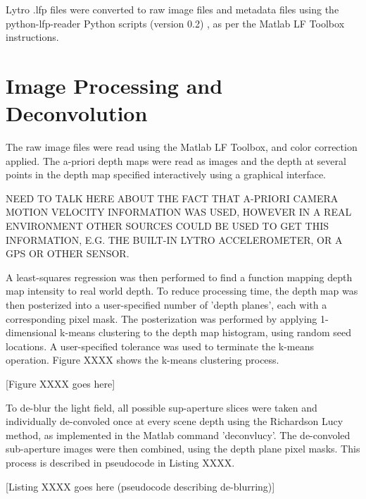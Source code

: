 Lytro .lfp files were converted to raw image files and metadata files using the python-lfp-reader Python scripts (version 0.2) \cite{esfahbod2013python}, as per the Matlab LF Toolbox instructions.


\section{Image Processing and Deconvolution}

The raw image files were read using the Matlab LF Toolbox, and color correction applied.
The a-priori depth maps were read as images and the depth at several points in the depth map specified interactively using a graphical interface.

NEED TO TALK HERE ABOUT THE FACT THAT A-PRIORI CAMERA MOTION VELOCITY INFORMATION WAS USED, HOWEVER IN A REAL ENVIRONMENT OTHER SOURCES COULD BE USED TO GET THIS INFORMATION, E.G. THE BUILT-IN LYTRO ACCELEROMETER, OR A GPS OR OTHER SENSOR.

A least-squares regression was then performed to find a function mapping depth map intensity to real world depth.
To reduce processing time, the depth map was then posterized into a user-specified number of 'depth planes', each with a corresponding pixel mask.
The posterization was performed by applying 1-dimensional k-means clustering to the depth map histogram, using random seed locations.
A user-specified tolerance was used to terminate the k-means operation.
Figure XXXX shows the k-means clustering process.

[Figure XXXX goes here]

To de-blur the light field, all possible sup-aperture slices were taken and individually de-convoled once at every scene depth using the Richardson Lucy method, as implemented in the Matlab command 'deconvlucy'.
The de-convoled sub-aperture images were then combined, using the depth plane pixel masks.
This process is described in pseudocode in Listing XXXX.

[Listing XXXX goes here (pseudocode describing de-blurring)]


%
%    
%    
%    


